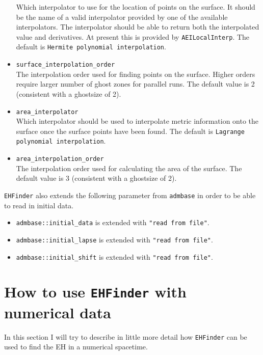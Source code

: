 \begin{itemize}
  Which interpolator to use for the location of points on the surface. It
  should be the name of a valid interpolator provided by one of the available
  interpolators. The interpolator should be able to return both the
  interpolated value and derivatives. At present this is provided by
  {\tt AEILocalInterp}. The default is {\tt Hermite polynomial interpolation}.
\item {\tt surface\_interpolation\_order} \\
  The interpolation order used for finding points on the surface. Higher
  orders require larger number of ghost zones for parallel runs. The default
  value is 2 (consistent with a ghostsize of 2).
\item {\tt area\_interpolator} \\
  Which interpolator should be used to interpolate metric information onto the
  surface once the surface points have been found. The default is
  {\tt Lagrange polynomial interpolation}.
\item {\tt area\_interpolation\_order} \\
  The interpolation order used for calculating the area of the surface.
  The default value is 3 (consistent with a ghostsize of 2).
\end{itemize}
{\tt EHFinder} also extends the following parameter from {\tt admbase} in order
to be able to read in initial data.
\begin{itemize}
\item {\tt admbase::initial\_data} is extended with {\tt "read from file"}.
\item {\tt admbase::initial\_lapse} is extended with {\tt "read from file"}.
\item {\tt admbase::initial\_shift} is extended with {\tt "read from file"}.
\end{itemize}
\section{How to use {\tt EHFinder} with numerical data}
\label{AEIThorns_EHFinder_UseThorn}
In this section I will try to describe in little more detail how {\tt EHFinder}
can be used to find the EH in a numerical spacetime.

